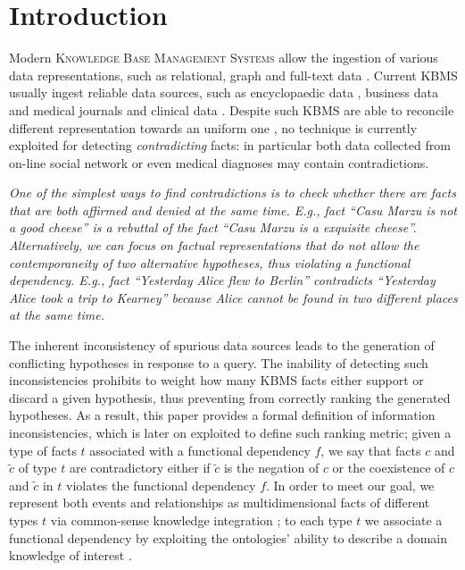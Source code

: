 
\section{Introduction}

Modern \textsc{Knowledge Base Management Systems} allow the ingestion of various data representations, such as relational, graph and full-text data \cite{ibmwatson}. Current KBMS usually ingest reliable data sources, such as encyclopaedic data \cite{ibmwatson}, business data \cite{Saha16} and medical journals and clinical data \cite{WANG201834}. 
Despite such KBMS are able to reconcile different representation towards an uniform one \cite{Niu}, no technique is currently exploited for detecting \textit{contradicting} facts: in particular both data collected from on-line social network \cite{Lazer1094} or even medical diagnoses \cite{imihl} may contain contradictions.


\begin{example}
\textit{One of the simplest ways to find contradictions is to check whether there are facts that are both affirmed and denied at the same time. E.g., fact ``Casu Marzu is not a good cheese'' is a rebuttal of the fact ``Casu Marzu is a exquisite cheese''. Alternatively, we can focus on factual representations that do not allow the contemporaneity of two alternative hypotheses, thus violating a functional dependency. E.g., fact ``Yesterday Alice flew to Berlin'' contradicts ``Yesterday Alice took a trip to Kearney'' because Alice cannot be found in two different places at the same time.}
\end{example}

The inherent inconsistency of spurious data sources leads to the generation of conflicting hypotheses in response to a query. The inability of detecting such inconsistencies prohibits to weight how many KBMS facts either support or discard a given hypothesis, thus preventing from correctly ranking the generated hypotheses. As a result, this paper provides a formal definition of information inconsistencies, which is later on exploited to define such ranking metric; given a type of facts $t$ associated with a functional dependency $f$, we say that facts $c$ and $\tilde{c}$ of type $t$ are contradictory either if $\tilde{c}$ is the negation of $c$ or the coexistence of $c$ and $\tilde{c}$ in $t$ violates the functional dependency $f$. In order to meet our goal, we represent both events and relationships as multidimensional facts of different types $t$ via common-sense knowledge integration \cite{SpeerCH16}; to each type $t$ we associate a functional dependency by exploiting the ontologies' ability to describe a domain knowledge of interest \cite{FORTINEAU2015573}.

